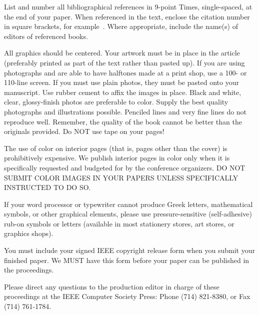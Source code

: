 \documentclass[times, 10pt,twocolumn]{article}
\begin{document}

List and number all bibliographical references in 9-point Times, 
single-spaced, at the end of your paper. When referenced in the text, 
enclose the citation number in square brackets, for example~\cite{ex1}. 
Where appropriate, include the name(s) of editors of referenced books.


All graphics should be centered. Your artwork must be in place in the 
article (preferably printed as part of the text rather than pasted up). 
If you are using photographs and are able to have halftones made at a 
print shop, use a 100- or 110-line screen. If you must use plain photos, 
they must be pasted onto your manuscript. Use rubber cement to affix the 
images in place. Black and white, clear, glossy-finish photos are 
preferable to color. Supply the best quality photographs and 
illustrations possible. Penciled lines and very fine lines do not 
reproduce well. Remember, the quality of the book cannot be better than 
the originals provided. Do NOT use tape on your pages!


The use of color on interior pages (that is, pages other
than the cover) is prohibitively expensive. We publish interior pages in 
color only when it is specifically requested and budgeted for by the 
conference organizers. DO NOT SUBMIT COLOR IMAGES IN YOUR 
PAPERS UNLESS SPECIFICALLY INSTRUCTED TO DO SO.


If your word processor or typewriter cannot produce Greek letters, 
mathematical symbols, or other graphical elements, please use 
pressure-sensitive (self-adhesive) rub-on symbols or letters (available 
in most stationery stores, art stores, or graphics shops).


You must include your signed IEEE copyright release form when you submit 
your finished paper. We MUST have this form before your paper can be 
published in the proceedings.


Please direct any questions to the production editor in charge of these 
proceedings at the IEEE Computer Society Press: Phone (714) 821-8380, or 
Fax (714) 761-1784.

\nocite{ex1,ex2}


\end{document}
